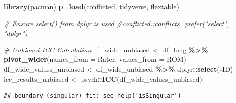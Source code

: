 \documentclass[
]{article}
\newenvironment{Shaded}{\begin{snugshade}}{\end{snugshade}}
\newcommand{\AttributeTok}[1]{\textcolor[rgb]{0.13,0.29,0.53}{#1}}
\newcommand{\CommentTok}[1]{\textcolor[rgb]{0.56,0.35,0.01}{\textit{#1}}}
\newcommand{\FunctionTok}[1]{\textcolor[rgb]{0.13,0.29,0.53}{\textbf{#1}}}
\newcommand{\NormalTok}[1]{#1}
\newcommand{\OtherTok}[1]{\textcolor[rgb]{0.56,0.35,0.01}{#1}}
\newcommand{\SpecialCharTok}[1]{\textcolor[rgb]{0.81,0.36,0.00}{\textbf{#1}}}
\begin{document}
\begin{Shaded}
\begin{Highlighting}[]
\FunctionTok{library}\NormalTok{(pacman)}
\FunctionTok{p\_load}\NormalTok{(conflicted, tidyverse, flextable)}

\CommentTok{\# Ensure select() from dplyr is used}
\CommentTok{\#conflicted::conflicts\_prefer("select", "dplyr")}

\CommentTok{\# Unbiased ICC Calculation}
\NormalTok{df\_wide\_unbiased }\OtherTok{\textless{}{-}}\NormalTok{ df\_long }\SpecialCharTok{\%\textgreater{}\%}
  \FunctionTok{pivot\_wider}\NormalTok{(}\AttributeTok{names\_from =}\NormalTok{ Rater, }\AttributeTok{values\_from =}\NormalTok{ ROM)}
\NormalTok{df\_wide\_values\_unbiased }\OtherTok{\textless{}{-}}\NormalTok{ df\_wide\_unbiased }\SpecialCharTok{\%\textgreater{}\%}\NormalTok{ dplyr}\SpecialCharTok{::}\FunctionTok{select}\NormalTok{(}\SpecialCharTok{{-}}\NormalTok{ID)}
\NormalTok{icc\_results\_unbiased }\OtherTok{\textless{}{-}}\NormalTok{ psych}\SpecialCharTok{::}\FunctionTok{ICC}\NormalTok{(df\_wide\_values\_unbiased)}
\end{Highlighting}
\end{Shaded}

\begin{verbatim}
## boundary (singular) fit: see help('isSingular')
\end{verbatim}
\end{document}
